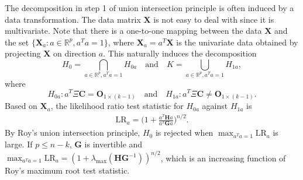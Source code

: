 \documentclass[12pt]{article} %
\newcommand{\bX}{\mathbf{X}}
\newcommand{\bH}{\mathbf{H}}
\newcommand{\bG}{\mathbf{G}}
\newcommand{\bC}{\mathbf{C}}
\newcommand{\bO}{\mathbf{O}}
\theoremstyle{definition}
\begin{document}
The decomposition in step 1 of union intersection principle is often induced by a data transformation.
The data matrix $\bX$ is not easy to deal with since it is multivariate. 
 Note that there is a one-to-one mapping between the data $\bX$ and the set $\{\bX_a: a\in\mathbb{R}^p, a^T a=1\}$, where $\bX_a=a^T \bX$ is the univariate data obtained by projecting $\bX$ on direction $a$.
 This naturally induces the decomposition  
 $$H_0=\bigcap_{a\in \mathbb{R}^p, a^T a=1}H_{0a} \quad\text{and}\quad K=\bigcup_{a\in \mathbb{R}^p,a^T a=1}H_{1a} ,$$
 where
 $$
 H_{0a}: a^T \Xi \bC = \bO_{1\times (k-1)}\quad \text{and}\quad H_{1a} : a^T \Xi \bC \neq \bO_{1\times (k-1)}.
 $$
Based on $\bX_a$, the likelihood ratio test statistic for $H_{0a}$ against $H_{1a}$ is
\begin{equation*}
    \begin{aligned}
        \text{LR}_{a}%
        =
        \Big(1+\frac{a^T \bH a}{a^T \bG a}\Big)^{n/2}.
    \end{aligned}
\end{equation*}
By Roy's union intersection principle, $H_0$ is rejected when $\max_{a^T a=1}\text{LR}_a$ is large.
If $p\leq n-k$, $\bG$ is invertible and
$\max_{a^T a=1}\text{LR}_a=(1+\lambda_{\max}(\bH\bG^{-1}))^{n/2}$, which is an increasing function of Roy's maximum root test statistic.
\end{document}
